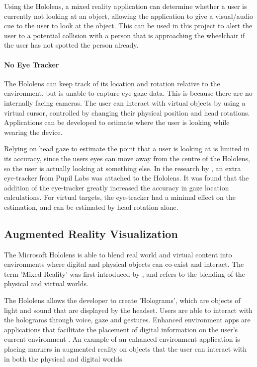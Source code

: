 \documentclass[12pt,a4paper]{report}
\begin{document}
Using the Hololens, a mixed reality application can determine whether a user is currently not looking at an object, allowing the application to give a visual/audio cue to the user to look at the object. This can be used in this project to alert the user to a potential collision with a  person that is approaching the wheelchair if the user has not spotted the person already.


\paragraph{No Eye Tracker}
The Hololens can keep track of its location and rotation relative to the environment, but is unable to capture eye gaze data. This is because there are no internally facing cameras. The user can interact with virtual objects by using a virtual cursor, controlled by changing their physical position and head rotations. Applications can be developed to estimate where the user is looking while wearing the device. 

Relying on head gaze to estimate the point that a user is looking at is limited in its accuracy, since the users eyes can move away from the centre of the Hololens, so the user is actually looking at something else. In the research by \cite{VanderMeulen2017}, an extra eye-tracker from Pupil Labs was attached to the Hololens. It was found that the addition of the eye-tracker greatly increased the accuracy in gaze location calculations. For virtual targets, the eye-tracker had a minimal effect on the estimation, and can be estimated by head rotation alone.

\subsection{Augmented Reality Visualization}
The Microsoft Hololens is able to blend real world and virtual content into environments where digital and physical objects can co-exist and interact. The term 'Mixed Reality' was first introduced by \cite{Milgram1994}, and refers to the blending of the physical and virtual worlds.

The Hololens allows the developer to create 'Holograms', which are objects of light and sound that are displayed by the headset. Users are able to interact with the holograms through voice, gaze and gestures. Enhanced environment apps are applications that facilitate the placement of digital information on the user's current environment \citep{Microsofta}. An example of an enhanced environment application is placing markers in augmented reality on objects that the user can interact with in both the physical and digital worlds. 
\end{document}
